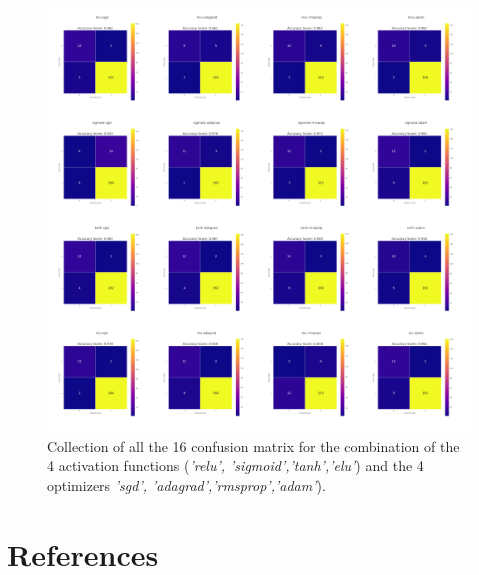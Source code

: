 \documentclass[english,notitlepage,reprint,nofootinbib]{revtex4-1}  %
\begin{document}
\begin{figure}[h]
    \centering 
    \includegraphics[scale=0.37]{results/confusionmatrix_nn_overall.png}
    \caption{Collection of all the 16 confusion matrix for the combination of the 4 activation functions (\textit{'relu', 'sigmoid','tanh','elu'}) and the 4 optimizers \textit{'sgd', 'adagrad','rmsprop','adam'}).}
    \label{res:nn_tot}
\end{figure}

\clearpage

\section*{References}\label{sec:references}


\end{document}
